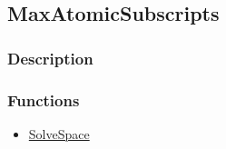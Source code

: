 \subsection{MaxAtomicSubscripts}\label{MaxAtomicSubscripts}
\subsubsection{Description}

\subsubsection{Functions}
\begin{itemize}
\item \hyperref[SolveSpace]{SolveSpace}
\end{itemize}


